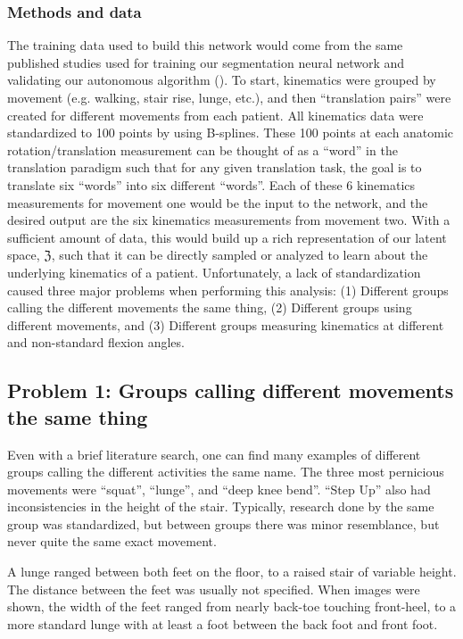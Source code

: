 \subsubsection{Methods and data}
The training data used to build this network would come from the same published studies used for training our segmentation neural network and validating our autonomous algorithm ().
To start, kinematics were grouped by movement (e.g. walking, stair rise, lunge, etc.), and then ``translation pairs'' were created for different movements from each patient.
All kinematics data were standardized to 100 points by using B-splines.
These 100 points at each anatomic rotation/translation measurement can be thought of as a ``word'' in the translation paradigm such that for any given translation task, the goal is to translate six ``words'' into six different ``words''.
Each of these 6 kinematics measurements for movement one would be the input to the network, and the desired output are the six kinematics measurements from movement two.
With a sufficient amount of data, this would build up a rich representation of our latent space, $\mathfrak{Z}$, such that it can be directly sampled or analyzed to learn about the underlying kinematics of a patient.
Unfortunately, a lack of standardization caused three major problems when performing this analysis: (1) Different groups calling the different movements the same thing, (2) Different groups using different movements, and (3) Different groups measuring kinematics at different and non-standard flexion angles.

\subsection{Problem 1: Groups calling different movements the same thing}
Even with a brief literature search, one can find many examples of different groups calling the different activities the same name.
The three most pernicious movements were ``squat'', ``lunge'', and ``deep knee bend''. ``Step Up'' also had inconsistencies in the height of the stair.
Typically, research done by the same group was standardized, but between groups there was minor resemblance, but never quite the same exact movement.

A lunge ranged between both feet on the floor, to a raised stair of variable height. The distance between the feet was usually not specified.
When images were shown, the width of the feet ranged from nearly back-toe touching front-heel, to a more standard lunge with at least a foot between the back foot and front foot.

